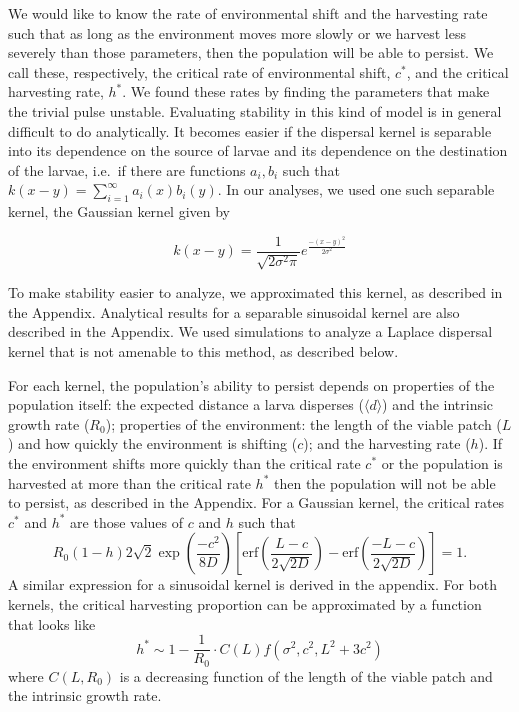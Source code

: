 \documentclass[12pt,english]{article}
\begin{document}
\begin{spacing}{1.9}
\begin{flushleft}
We would like to know the rate of environmental shift and the harvesting rate such that as long as the 
environment moves more slowly or we harvest less severely than those parameters, then the population will be able to persist. 
We call these, respectively, the critical rate of environmental shift, $c^*$, and the critical harvesting rate, $h^*$. 
We found these rates by finding the parameters that make the trivial pulse unstable. Evaluating stability in this kind of model is in 
general difficult to do analytically. It becomes easier if the dispersal kernel is separable into its dependence on the 
source of larvae and its dependence on the destination of the larvae,
i.e.~if there are functions $a_i, b_i$ such that $k(x- y) = \sum^\infty_{i=1} a_i(x)b_i(y)$.  In our analyses, we used one such separable kernel, the Gaussian kernel given by

\[k(x-y)=\frac{1}{\sqrt{2\sigma^2\pi}}e^{\frac{-(x-y)^2}{2\sigma^2}}\]

\noindent To make stability easier to analyze, we approximated this kernel, as described in the Appendix.  Analytical results for a separable sinusoidal kernel are also described in the Appendix.  We used 
simulations to analyze a Laplace dispersal kernel that is not amenable to this method, as described below.


For each kernel, the population's ability to persist depends on properties of the population itself: the expected distance a larva disperses ($\langle d \rangle$) and the intrinsic growth rate ($R_0$); properties of the environment: the 
length of the viable patch ($L$) and how quickly the environment is shifting ($c$); and the harvesting rate ($h
$). If the environment shifts more quickly than the critical rate $c^*$ or the population is harvested at more than 
the critical rate $h^*$ then the population will not be able to persist, as described in the Appendix.  For a Gaussian kernel, the critical rates $c^*$ and $h^*$ are those values of $c$ and $h$ such that 
$$R_0(1-h)2\sqrt{2}\exp\left(\frac{-c^2}{8D}\right)\left[\text{erf}\left(\frac{L-c}{2\sqrt{2D}}\right)-\text{erf}\left(\frac{-L-c}{2\sqrt{2D}}\right)\right]=1.$$
A similar expression for a sinusoidal kernel is derived in the appendix.  For both kernels, the critical harvesting proportion can be approximated by a function that looks like 
\begin{equation}
h^*\sim1- \frac{1}{R_0}\cdot C(L)f(\sigma^2,c^2,L^2+3c^2)
\end{equation}
where $C(L,R_0)$ is a decreasing function of the length of the viable patch and the intrinsic growth rate.


\end{flushleft}
\end{spacing}
\end{document}
